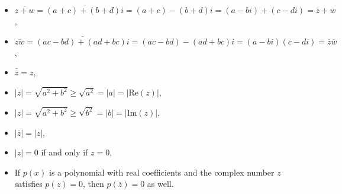 \begin{itemize}
\item $\overline{z+w} = \overline{(a+c) + (b+d)i} = (a+c)-(b+d)i = (a-bi) + (c-di) = \overline{z} + \overline{w}$,
\item $\overline{zw} = \overline{(ac-bd) + (ad+bc)i} = (ac-bd)-(ad+bc)i = (a-bi)(c-di) = \overline{z} \overline{w}$,
\item $\overline{\overline{z}} = z$,
\item $|z| = \sqrt{a^2+b^2} \geq \sqrt{a^2} = |a| = |\text{Re}(z)|$,
\item $|z| = \sqrt{a^2+b^2} \geq \sqrt{b^2} = |b| = |\text{Im}(z)|$,
\item $\left| \overline{z} \right| = |z|$,
\item $|z| = 0$ if and only if $z = 0$,
\item If $p(x)$ is a polynomial with real coefficients and the complex number $z$ satisfies $p(z) = 0$, then $p\left(\overline{z}\right) = 0$ as well. 
\end{itemize}

